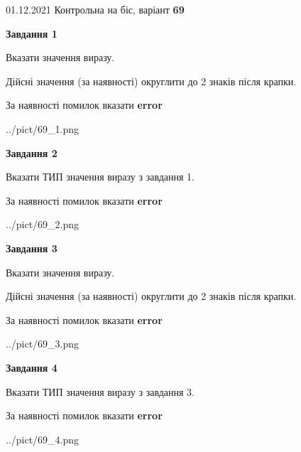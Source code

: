 \documentclass[11pt, ukrainian]{article}
\begin{document}
{01.12.2021 Контрольна на біс, варіант  \No \textbf { 69 }\par}
{
\begin {large}
{\begin {center}\textbf{Завдання 1}\end {center}}\par
Вказати значення виразу. \par
Дійсні значення (за наявності) округлити до 2 знаків після крапки. \par
За наявності помилок вказати \textbf{error}

\begin{center}
	{../pict/69_1.png}
\end{center}
\newpage

{\begin {center}\textbf{Завдання 2}\end {center}}\par
Вказати ТИП значення виразу з завдання 1. \par
За наявності помилок вказати \textbf{error}

\begin{center}
	{../pict/69_2.png}
\end{center}
\newpage

{\begin {center}\textbf{Завдання 3}\end {center}}\par
Вказати значення виразу. \par
Дійсні значення (за наявності) округлити до 2 знаків після крапки. \par
За наявності помилок вказати \textbf{error}

\begin{center}
	{../pict/69_3.png}
\end{center}
\newpage

{\begin {center}\textbf{Завдання 4}\end {center}}\par
Вказати ТИП значення виразу з завдання 3. \par
За наявності помилок вказати \textbf{error}

\begin{center}
	{../pict/69_4.png}
\end{center}
\newpage


\end{large}}
\end{document}
